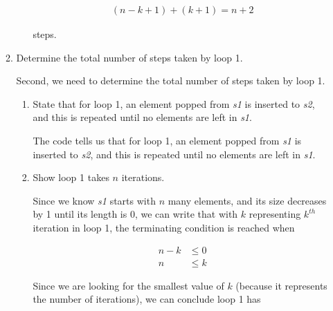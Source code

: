 \documentclass[12pt]{article}
\begin{document}
\begin{enumerate}[a.]
\begin{mdframed}
\begin{enumerate}[1.]
\begin{enumerate}[1.]
\begin{mdframed}
                \begin{align}
                    (n - k + 1) + (k + 1) = n + 2
                \end{align}

                steps.

                \end{mdframed}
            \end{enumerate}

            \item Determine the total number of steps taken by loop 1.

            \bigskip

            Second, we need to determine the total number of steps taken by loop 1.

            \bigskip

            \begin{enumerate}[1.]
                \item State that for loop 1, an element popped from \textit{s1}
                is inserted to \textit{s2}, and this is repeated until no elements are left in \textit{s1}.

                \begin{mdframed}
                The code tells us that for loop 1, an element popped from \textit{s1} is inserted to \textit{s2},
                and this is repeated until no elements are left in \textit{s1}.
                \end{mdframed}

                \item Show loop 1 takes $n$ iterations.

                \begin{mdframed}
                Since we know \textit{s1} starts with $n$ many elements, and its size decreases
                by 1 until its length is 0, we can write that with $k$ representing
                $k^{th}$ iteration in loop 1, the terminating condition is reached when

                \begin{align}
                    n - k &\leq 0\\
                    n &\leq k
                \end{align}

                \bigskip

                Since we are looking for the smallest value of $k$ (because it represents
                the number of iterations), we can conclude loop 1 has


\end{mdframed}
\end{enumerate}
\end{enumerate}
\end{mdframed}
\end{enumerate}
\end{document}
